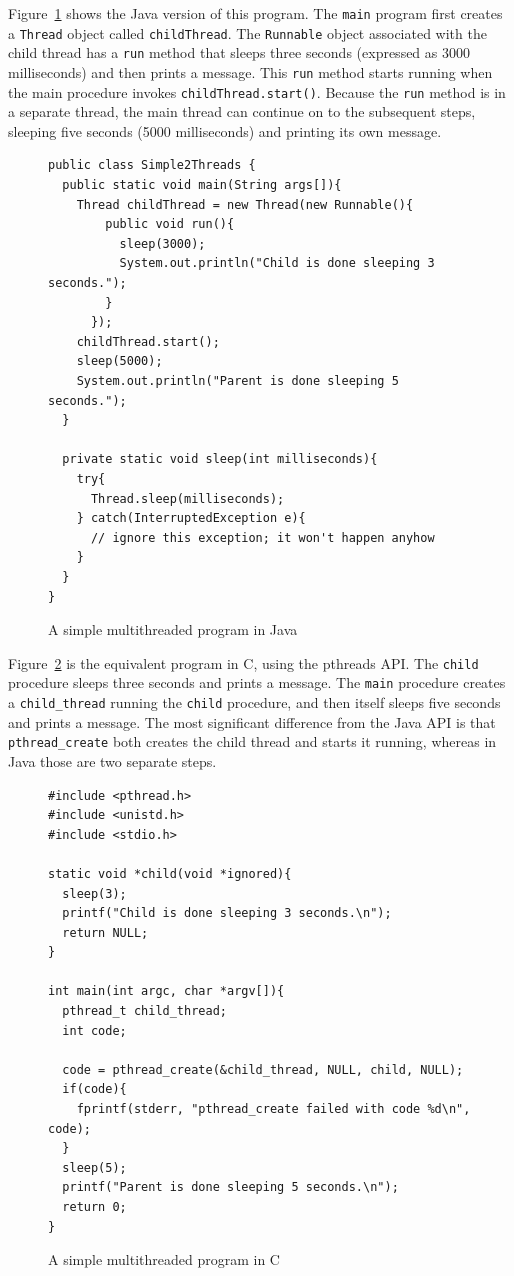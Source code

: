 Figure~\ref{Simple2Threads} shows the Java version of this program.
The \verb|main| program first creates a
\verb|Thread| object called
\verb|childThread|.  The
\verb|Runnable| object associated
with the child thread has a \verb|run| method that sleeps three
seconds (expressed as 3000
milliseconds) and then prints a message.  This \verb|run| method starts
running when the main procedure invokes \verb|childThread.start()|.
Because the \verb|run| method is in a separate thread, the main thread
can continue on to the subsequent steps, sleeping five seconds (5000 milliseconds)
and printing its own message.
\begin{figure}
\begin{verbatim}
public class Simple2Threads {
  public static void main(String args[]){
    Thread childThread = new Thread(new Runnable(){
        public void run(){
          sleep(3000);
          System.out.println("Child is done sleeping 3 seconds.");
        }
      });
    childThread.start();
    sleep(5000);
    System.out.println("Parent is done sleeping 5 seconds.");
  }
  
  private static void sleep(int milliseconds){
    try{
      Thread.sleep(milliseconds);
    } catch(InterruptedException e){
      // ignore this exception; it won't happen anyhow
    }
  }
}
\end{verbatim}
\caption{A simple multithreaded program in Java}
\label{Simple2Threads}
\end{figure}

Figure~\ref{simple2threads} is the equivalent program in C, using the
pthreads API.  The \verb|child| procedure sleeps three seconds and prints a
message.  The \verb|main| procedure creates a \verb|child_thread|
running the \verb|child| procedure, and then itself sleeps
five seconds and prints a message.  The most significant difference from the
Java API is that
\verb|pthread_create|
both creates the child thread and starts it running, whereas in Java
those are two separate steps.
\begin{figure}
\begin{verbatim}
#include <pthread.h>
#include <unistd.h>
#include <stdio.h>

static void *child(void *ignored){
  sleep(3);
  printf("Child is done sleeping 3 seconds.\n");
  return NULL;
}

int main(int argc, char *argv[]){
  pthread_t child_thread;
  int code;

  code = pthread_create(&child_thread, NULL, child, NULL);
  if(code){
    fprintf(stderr, "pthread_create failed with code %d\n", code);
  }
  sleep(5);
  printf("Parent is done sleeping 5 seconds.\n");
  return 0;
}
\end{verbatim}
\caption{A simple multithreaded program in C}
\label{simple2threads}
\end{figure}


